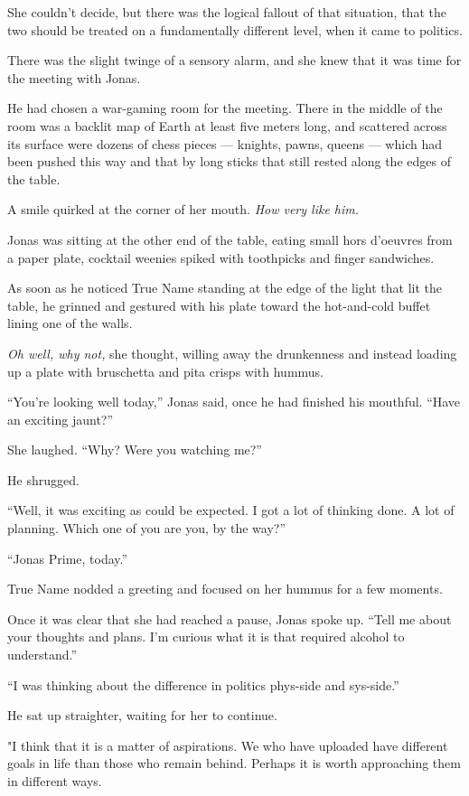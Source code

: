 She couldn't decide, but there was the logical fallout of that situation, that the two should be treated on a fundamentally different level, when it came to politics.

There was the slight twinge of a sensory alarm, and she knew that it was time for the meeting with Jonas.

He had chosen a war-gaming room for the meeting. There in the middle of the room was a backlit map of Earth at least five meters long, and scattered across its surface were dozens of chess pieces — knights, pawns, queens — which had been pushed this way and that by long sticks that still rested along the edges of the table.

A smile quirked at the corner of her mouth. \emph{How very like him.}

Jonas was sitting at the other end of the table, eating small hors d'oeuvres from a paper plate, cocktail weenies spiked with toothpicks and finger sandwiches.

As soon as he noticed True Name standing at the edge of the light that lit the table, he grinned and gestured with his plate toward the hot-and-cold buffet lining one of the walls.

\emph{Oh well, why not,} she thought, willing away the drunkenness and instead loading up a plate with bruschetta and pita crisps with hummus.

``You're looking well today,'' Jonas said, once he had finished his mouthful. ``Have an exciting jaunt?''

She laughed. ``Why? Were you watching me?''

He shrugged.

``Well, it was exciting as could be expected. I got a lot of thinking done. A lot of planning. Which one of you are you, by the way?''

``Jonas Prime, today.''

True Name nodded a greeting and focused on her hummus for a few moments.

Once it was clear that she had reached a pause, Jonas spoke up. ``Tell me about your thoughts and plans. I'm curious what it is that required alcohol to understand.''

``I was thinking about the difference in politics phys-side and sys-side.''

He sat up straighter, waiting for her to continue.

"I think that it is a matter of aspirations. We who have uploaded have different goals in life than those who remain behind. Perhaps it is worth approaching them in different ways.

